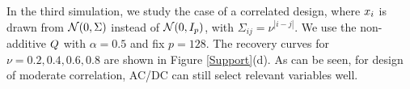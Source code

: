 In the third simulation, we study the case of a correlated design, where
$x_i$ is drawn from $\mathcal{N}(0,\Sigma)$
instead of $\mathcal{N}(0,I_{p})$, with
$\Sigma_{ij}=\nu^{|i-j|}$. We use the non-additive $Q$ with
$\alpha=0.5$ and fix $p=128$.  The recovery curves for $\nu=0.2, 0.4,
0.6, 0.8$ are shown in Figure \ref{Support}(d). As can be seen, for
design of moderate correlation, AC/DC can still select relevant
variables well.





